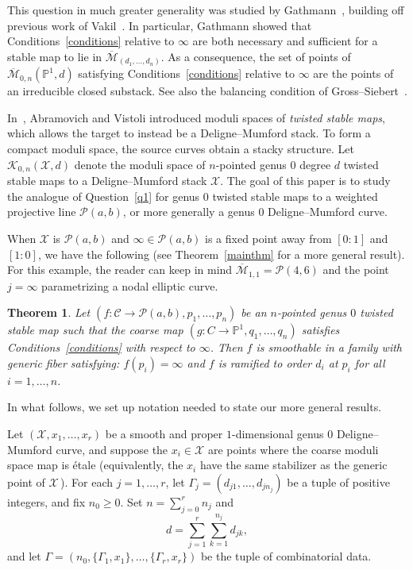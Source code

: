 \documentclass[11pt]{amsart}
\numberwithin{equation}{section}
\newtheorem{theorem}{Theorem}[section]
\theoremstyle{definition}
\theoremstyle{remark}
\newcommand{\bP}{{\mathbb P}}
\newcommand{\calK}{\mathcal K}
\newcommand{\calM}{\mathcal M}
\newcommand{\calX}{\mathcal X}
\newcommand{\calC}{\mathcal C}
\newcommand{\calP}{\mathcal P}
\newcommand{\mapsdc}{\overline{\mathcal{M}}_{(d_1, \ldots, d_n)}}
\begin{document}
This question in much greater generality was studied by Gathmann~\cite[Proposition 1.14]{Gathmann}, building off previous work of Vakil~\cite[Theorem 6.1]{Vakil}. In particular, Gathmann showed that Conditions~\ref{conditions} relative to $\infty$ are both necessary and sufficient for a stable map to lie in $\mapsdc$. As a consequence, the set of points of $\overline{\mathcal{M}}_{0,n}(\bP^1, d)$ satisfying Conditions~\ref{conditions} relative to $\infty$ are the points of an irreducible closed substack. See also the balancing condition of Gross--Siebert~\cite[Definition 1.12 and Lemma 1.15]{GS}. 


In~\cite{av}, Abramovich and Vistoli introduced moduli spaces of \emph{twisted stable maps}, which allows the target to instead be a Deligne--Mumford stack. To form a compact moduli space, the source curves obtain a stacky structure. Let $\calK_{0,n}(\calX, d)$ denote the moduli space of $n$-pointed genus $0$ degree $d$ twisted stable maps to a Deligne--Mumford stack $\calX$. The goal of this paper is to study the analogue of Question~\ref{q1} for genus $0$ twisted stable maps to a weighted projective line $\calP(a,b)$, or more generally a genus $0$ Deligne--Mumford curve.

When $\calX$ is $\calP(a,b)$ and $\infty \in \calP(a,b)$ is a fixed point away from $[0:1]$ and $[1:0]$, we have the following (see Theorem~\ref{mainthm} for a more general result). For this example, the reader can keep in mind   $\overline{\calM}_{1,1} = \calP(4,6)$ and the point $j = \infty$ parametrizing a nodal elliptic curve. 

\begin{theorem}\label{thm:main1} Let $(f \colon \calC \to \calP(a,b), p_1, \ldots, p_n)$ be an $n$-pointed genus $0$ twisted stable map such that the coarse map $(g \colon C \to \mathbb{P}^1, q_1, \ldots, q_n)$ satisfies Conditions~\ref{conditions} with respect to $\infty$. Then $f$ is smoothable in a family with generic fiber satisfying: $f(p_i) = \infty$ and $f$ is ramified to order $d_i$ at $p_i$ for all $i = 1, \ldots, n$. 
\end{theorem}
\noindent In what follows, we set up notation needed to state our more general results.

\medskip
 Let $(\calX, x_1, \ldots, x_r)$ be a smooth and proper $1$-dimensional genus $0$ Deligne--Mumford curve, and suppose the $x_i \in \calX$ are points where the coarse moduli space map is \'etale (equivalently, the $x_i$ have the same stabilizer as the generic point of $\calX$\,). For each $j = 1, \ldots, r$, let $\Gamma_j = (d_{j1}, \ldots, d_{jn_j})$ be a tuple of positive integers, and fix $n_0 \geq 0$. Set $n = \sum_{j=0}^r n_j$ and 
$$
d = \sum_{j=1}^r \sum_{k = 1}^{n_j} d_{jk},
$$
and let $\Gamma = (n_0,\{\Gamma_1,x_1\}, \ldots, \{\Gamma_r,x_r\})$ be the tuple of combinatorial data. 
\end{document}

